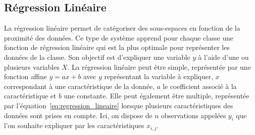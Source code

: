 %
%

\subsection{Régression Linéaire}
La régression linéaire permet de catégoriser des sous-espaces en fonction de la proximité des données. %
Ce type de système apprend pour chaque classe une fonction de régression linéaire qui est la plus optimale pour représenter les données de la classe. Son objectif est d'expliquer une variable $y$ à l'aide d'une ou plusieurs variables $X$. La régression linéaire peut être simple, représentée par une fonction affine $y=ax+b$ avec $y$ représentant la variable à expliquer, $x$ correspondant à une caractéristique de la donnée, $a$ le coefficient associé à la caractéristique et $b$ une constante.
Elle peut également être multiple, représentée par l'équation~\ref{eq:regression_lineaire} lorsque plusieurs caractéristiques des données sont prises en compte. Ici, on dispose de $n$ observations appelées $y_i$ que l'on souhaite expliquer par les caractéristiques $x_{i,j}$.

